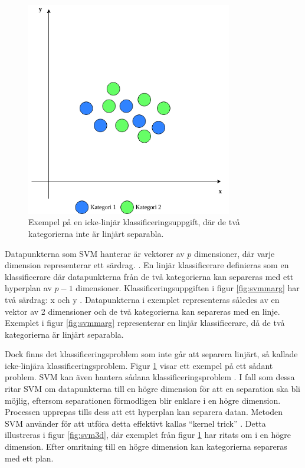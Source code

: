 \documentclass{kaumasters} %
\begin{document}
\begin{figure}[H]
\includegraphics[width=9cm]{nonlinearsvm}
\centering
\caption{Exempel på en icke-linjär klassificeringsuppgift, där de två kategorierna inte är linjärt separabla.}
\label{fig:svmnonl}
\end{figure} 

Datapunkterna som SVM hanterar är vektorer av $p$ dimensioner, där varje dimension representerar ett särdrag. \cite{svm:002}. En linjär klassificerare definieras som en klassificerare där datapunkterna från de två kategorierna kan separeras med ett hyperplan av $p-1$ dimensioner. Klassificeringsuppgiften i figur \ref{fig:svmmarg} har två särdrag: x och y \cite{svm:005}. Datapunkterna i exemplet representeras således av en vektor av 2 dimensioner och de två kategorierna kan separeras med en linje. Exemplet i figur \ref{fig:svmmarg} representerar en linjär klassificerare, då de två kategorierna är linjärt separabla. 

Dock finns det klassificeringsproblem som inte går att separera linjärt, så kallade icke-linjära klassificeringsproblem. Figur \ref{fig:svmnonl} visar ett exempel på ett sådant problem. SVM kan även hantera sådana klassificeringsproblem \cite{svm:002}. I fall som dessa ritar SVM om datapunkterna till en högre dimension för att en separation ska bli möjlig, eftersom separationen förmodligen blir enklare i en högre dimension. Processen upprepas tills dess att ett hyperplan kan separera datan.  Metoden SVM använder för att utföra detta effektivt kallas “kernel trick” \cite{svm:004}. Detta illustreras i figur \ref{fig:svm3d}, där exemplet från figur \ref{fig:svmnonl} har ritats om i en högre dimension. Efter omritning till en högre dimension kan kategorierna separeras med ett plan. 
\end{document}
